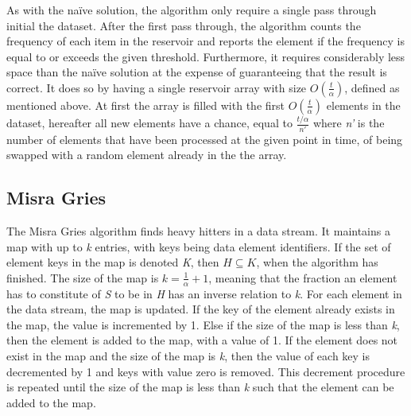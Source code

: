 As with the naïve solution, the algorithm only require a single pass through initial the dataset. After the first pass through, the algorithm counts the frequency of each item in the reservoir and reports the element if the frequency is equal to or exceeds the given threshold.
Furthermore, it requires considerably less space than the naïve solution at the expense of guaranteeing that the result is correct. It does so by having a single reservoir array with size \(O(\frac{t}{\alpha})\), defined as mentioned above. At first the array is filled with the first \(O(\frac{t}{\alpha})\) elements in the dataset, hereafter all new elements have a chance, equal to 
\begin{math}
	\frac{t/\alpha}{n'}
\end{math} where \textit{n'} is the number of elements that have been processed at the given point in time,
 of being swapped with a random element already in the the array.
 
\subsection{Misra Gries}
The Misra Gries algorithm finds heavy hitters in a data stream. It maintains a map with up to \textit{k} entries, with keys being data element identifiers. If the set of element keys in the map is denoted \textit{K}, then 
\begin{math}
	H \subseteq K
\end{math}, when the algorithm has finished. The size of the map is 
\begin{math}
	k = \frac{1}{\alpha} + 1
\end{math}, meaning that the fraction an element has to constitute of \textit{S} to be in \textit{H} has an inverse relation to \textit{k}.
For each element in the data stream, the map is updated. If the key of the element already exists in the map, the value is incremented by 1. Else if the size of the map is less than \textit{k}, then the element is added to the map, with a value of 1. If the element does not exist in the map and the size of the map is \textit{k}, then the value of each key is decremented by 1 and keys with value zero is removed. This decrement procedure is repeated until the size of the map is less than \textit{k} such that the element can be added to the map.

